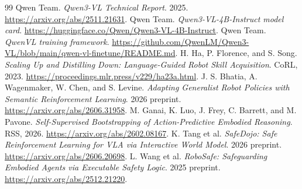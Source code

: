\documentclass[11pt]{article}
\begin{document}
\begin{thebibliography}{99}
 Qwen Team. \emph{Qwen3-VL Technical Report}. 2025. \url{https://arxiv.org/abs/2511.21631}.
 Qwen Team. \emph{Qwen3-VL-4B-Instruct model card}. \url{https://huggingface.co/Qwen/Qwen3-VL-4B-Instruct}.
 Qwen Team. \emph{QwenVL training framework}. \url{https://github.com/QwenLM/Qwen3-VL/blob/main/qwen-vl-finetune/README.md}.
 H. Ha, P. Florence, and S. Song. \emph{Scaling Up and Distilling Down: Language-Guided Robot Skill Acquisition}. CoRL, 2023. \url{https://proceedings.mlr.press/v229/ha23a.html}.
 J. S. Bhatia, A. Wagenmaker, W. Chen, and S. Levine. \emph{Adapting Generalist Robot Policies with Semantic Reinforcement Learning}. 2026 preprint. \url{https://arxiv.org/abs/2606.31958}.
 M. Ganai, K. Luo, J. Frey, C. Barrett, and M. Pavone. \emph{Self-Supervised Bootstrapping of Action-Predictive Embodied Reasoning}. RSS, 2026. \url{https://arxiv.org/abs/2602.08167}.
 K. Tang et al. \emph{SafeDojo: Safe Reinforcement Learning for VLA via Interactive World Model}. 2026 preprint. \url{https://arxiv.org/abs/2606.20698}.
 L. Wang et al. \emph{RoboSafe: Safeguarding Embodied Agents via Executable Safety Logic}. 2025 preprint. \url{https://arxiv.org/abs/2512.21220}.
\end{thebibliography}
\end{document}
